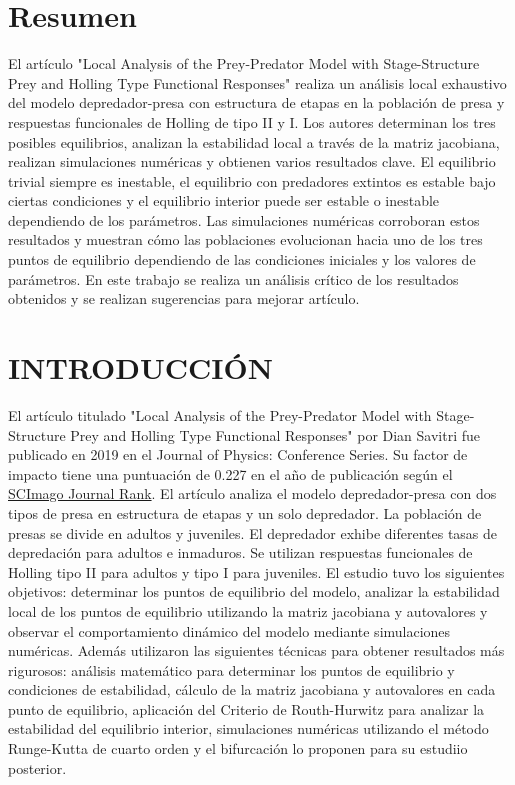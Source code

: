 \documentclass{wscpaperproc}
\theoremstyle{wsc}
\begin{document}
\section*{Resumen}
El artículo "Local Analysis of the Prey-Predator Model with Stage-Structure Prey and Holling
Type Functional Responses" realiza un análisis local exhaustivo del modelo depredador-presa con estructura de
etapas en la población de presa y respuestas funcionales de Holling de tipo II y I. Los autores determinan
los tres posibles equilibrios, analizan la estabilidad local a través de la matriz jacobiana, realizan
simulaciones numéricas y obtienen varios resultados clave. El equilibrio trivial siempre es inestable,
el equilibrio con predadores extintos es estable bajo ciertas condiciones y el equilibrio interior puede
ser estable o inestable dependiendo de los parámetros. Las simulaciones numéricas corroboran estos resultados
y muestran cómo las poblaciones evolucionan hacia uno de los tres puntos de equilibrio dependiendo de las
condiciones iniciales y los valores de parámetros. En este trabajo se realiza un análisis crítico de 
los resultados obtenidos y se realizan sugerencias para mejorar artículo.


\section{INTRODUCCI\'ON}
\label{sec:intro}
El artículo titulado "Local Analysis of the Prey-Predator Model with Stage-Structure Prey and Holling
Type Functional Responses" por Dian Savitri fue publicado en 2019
en el Journal of Physics: Conference Series. Su factor de impacto tiene una puntuaci\'on de 0.227 en el año de
publicación según el \href{https://www.scimagojr.com/}{SCImago Journal Rank}. El artículo analiza el modelo depredador-presa con dos tipos de presa en estructura
de etapas y un solo depredador. La población de presas se divide en adultos y juveniles. El depredador
exhibe diferentes tasas de depredación para adultos e inmaduros. Se utilizan respuestas funcionales de
Holling \cite{holling_functional_1965} tipo II  para adultos y tipo I para juveniles. El estudio tuvo los siguientes objetivos:
determinar los puntos de equilibrio del modelo, analizar la estabilidad local de los puntos de equilibrio
utilizando la matriz jacobiana y autovalores y observar el comportamiento dinámico del modelo mediante
simulaciones numéricas. Además utilizaron las siguientes técnicas para obtener resultados
más rigurosos: análisis matemático para determinar los puntos de equilibrio y condiciones de estabilidad,
cálculo de la matriz jacobiana y autovalores en cada punto de equilibrio, aplicación del Criterio de Routh-Hurwitz
para analizar la estabilidad del equilibrio interior, simulaciones numéricas utilizando el método Runge-Kutta de
cuarto orden y el bifurcación lo proponen para su estudiio posterior. 
\end{document}

